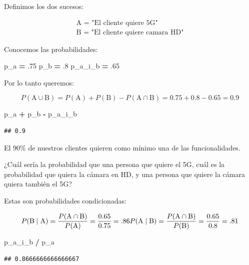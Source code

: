\documentclass[
]{article}
\newenvironment{Shaded}{\begin{snugshade}}{\end{snugshade}}
\newcommand{\FloatTok}[1]{\textcolor[rgb]{0.00,0.00,0.81}{#1}}
\newcommand{\NormalTok}[1]{#1}
\newcommand{\OperatorTok}[1]{\textcolor[rgb]{0.81,0.36,0.00}{\textbf{#1}}}
\begin{document}
Definimos los dos sucesos:

\[
\begin{array}{ll}
\text{A = "El cliente quiere 5G"}\\
\text{B = "El cliente quiere camara HD"} 
\end{array}
\]

Conocemos las probabilidades:

\begin{Shaded}
\begin{Highlighting}[]
\NormalTok{p\_a }\OperatorTok{=} \FloatTok{.75}
\NormalTok{p\_b }\OperatorTok{=} \FloatTok{.8}
\NormalTok{p\_a\_i\_b }\OperatorTok{=} \FloatTok{.65}
\end{Highlighting}
\end{Shaded}

Por lo tanto queremos:

\[
P(\text{A}\cup\text{B}) = P(\text{A}) + P(\text{B}) - P(\text{A}\cap\text{B}) = 0.75 + 0.8 - 0.65 = 0.9
\]

\begin{Shaded}
\begin{Highlighting}[]
\NormalTok{p\_a }\OperatorTok{+}\NormalTok{ p\_b }\OperatorTok{{-}}\NormalTok{ p\_a\_i\_b}
\end{Highlighting}
\end{Shaded}

\begin{verbatim}
## 0.9
\end{verbatim}

El 90\% de nuestros clientes quieren como mínimo una de las
funcionalidades.

¿Cuál sería la probabilidad que una persona que quiere el 5G, cuál es la
probabilidad que quiera la cámara en HD, y una persona que quiere la
cámara quiera también el 5G?

Estas son probabilidades condicionadas:

\[
P(\text{B}\mid\text{A}) = \frac{P(\text{A}\cap\text{B})}{P(\text{A})} = \frac{0.65}{0.75} = .86
\\
P(\text{A}\mid\text{B}) = \frac{P(\text{A}\cap\text{B})}{P(\text{B})} = \frac{0.65}{0.8} = .81
\]

\begin{Shaded}
\begin{Highlighting}[]
\NormalTok{p\_a\_i\_b }\OperatorTok{/}\NormalTok{ p\_a}
\end{Highlighting}
\end{Shaded}

\begin{verbatim}
## 0.8666666666666667
\end{verbatim}
\end{document}
